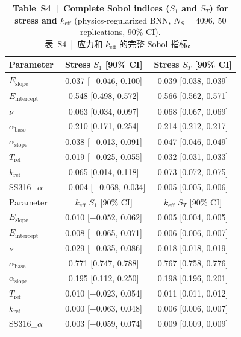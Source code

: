 \documentclass[11pt,a4paper]{article}
\newcommand{\keff}{\ensuremath{k_{\mathrm{eff}}}}
\newcommand{\Eint}{\ensuremath{E_{\mathrm{intercept}}}}
\newcommand{\Eslope}{\ensuremath{E_{\mathrm{slope}}}}
\newcommand{\abase}{\ensuremath{\alpha_{\mathrm{base}}}}
\newcommand{\aslope}{\ensuremath{\alpha_{\mathrm{slope}}}}
\newcommand{\kref}{\ensuremath{k_{\mathrm{ref}}}}
\newcommand{\Tref}{\ensuremath{T_{\mathrm{ref}}}}
\begin{document}
\begin{table}[htbp]
\centering
\caption{\textbf{Table~S4~|~Complete Sobol indices ($S_1$ and $S_T$) for
stress and \keff{}} (physics-regularized BNN, $N_S = 4096$,
50 replications, 90\% CI).\\
\small 表~S4~|~应力和 \keff{} 的完整 Sobol 指标。}
\label{tab:S4}
\smallskip
\small
\begin{tabular}{lcc}
\toprule
Parameter & Stress $S_1$ [90\% CI] & Stress $S_T$ [90\% CI] \\
\midrule
\Eslope{}    & 0.037 [$-$0.046, 0.100] & 0.039 [0.038, 0.039] \\
\Eint{}      & 0.548 [0.498, 0.572]    & 0.566 [0.562, 0.571] \\
$\nu$        & 0.063 [0.034, 0.097]    & 0.068 [0.067, 0.069] \\
\abase{}     & 0.210 [0.171, 0.254]    & 0.214 [0.212, 0.217] \\
\aslope{}    & 0.038 [$-$0.013, 0.091] & 0.047 [0.046, 0.049] \\
\Tref{}      & 0.019 [$-$0.025, 0.055] & 0.032 [0.031, 0.033] \\
\kref{}      & 0.065 [0.014, 0.118]    & 0.073 [0.072, 0.075] \\
SS316\_$\alpha$ & $-$0.004 [$-$0.068, 0.034] & 0.005 [0.005, 0.006] \\
\midrule
Parameter & \keff{} $S_1$ [90\% CI] & \keff{} $S_T$ [90\% CI] \\
\midrule
\Eslope{}    & 0.010 [$-$0.052, 0.062] & 0.005 [0.004, 0.005] \\
\Eint{}      & 0.008 [$-$0.065, 0.071] & 0.006 [0.006, 0.007] \\
$\nu$        & 0.029 [$-$0.035, 0.086] & 0.018 [0.018, 0.019] \\
\abase{}     & 0.771 [0.747, 0.788]    & 0.767 [0.758, 0.776] \\
\aslope{}    & 0.195 [0.112, 0.250]    & 0.198 [0.196, 0.201] \\
\Tref{}      & 0.010 [$-$0.023, 0.054] & 0.011 [0.011, 0.012] \\
\kref{}      & 0.000 [$-$0.063, 0.048] & 0.006 [0.006, 0.007] \\
SS316\_$\alpha$ & 0.003 [$-$0.059, 0.074] & 0.009 [0.009, 0.009] \\
\bottomrule
\end{tabular}
\end{table}
\end{document}
